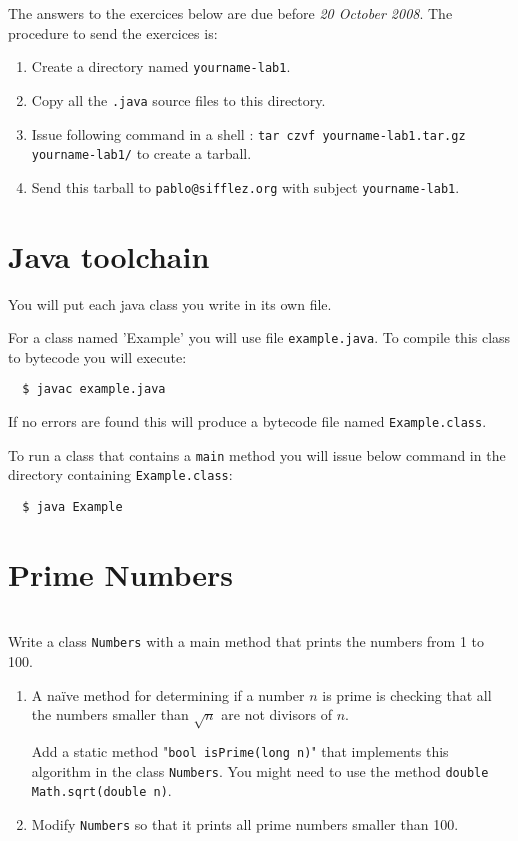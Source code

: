 \documentclass{exercices}
\renewcommand{\|}{\url|}
\begin{document}

The answers to the exercices below are due before \emph{20 October 2008}. 
The procedure to send the exercices is:
\begin{enumerate}
  \item Create a directory named \verb!yourname-lab1!.
  \item Copy all the \verb!.java! source files to this directory.
  \item Issue following command in a shell : \verb!tar czvf yourname-lab1.tar.gz yourname-lab1/!
        to create a tarball.
  \item Send this tarball to \verb!pablo@sifflez.org! with subject \verb!yourname-lab1!.
\end{enumerate}

\section{Java toolchain}
You will put each java class you write in its own file.

For a class named 'Example' you will use file \verb!example.java!.
To compile this class to bytecode you will execute:
\begin{verbatim}
  $ javac example.java
\end{verbatim}
If no errors are found this will produce a bytecode file named \verb!Example.class!.

To run a class that contains a \verb!main! method you will issue below command
in the directory containing \verb!Example.class!:
\begin{verbatim}
  $ java Example
\end{verbatim}

\section{Prime Numbers}
\begin{exercice}\\ 
Write a class \verb!Numbers! with a main method that prints the numbers from 1 to 100.
\end{exercice}
\begin{exercice}
\begin{enumerate}
\item
A naïve method for determining if a number $n$ is prime is checking that all the numbers smaller
than $\sqrt{n}$ are not divisors of $n$.

Add a static method "\verb!bool isPrime(long n)!" that implements this algorithm in the class \verb!Numbers!.
You might need to use the method \verb!double Math.sqrt(double n)!.
\item
 Modify \verb!Numbers! so that it prints all prime numbers smaller than 100.
\end{enumerate}
\end{exercice}
\end{document}
